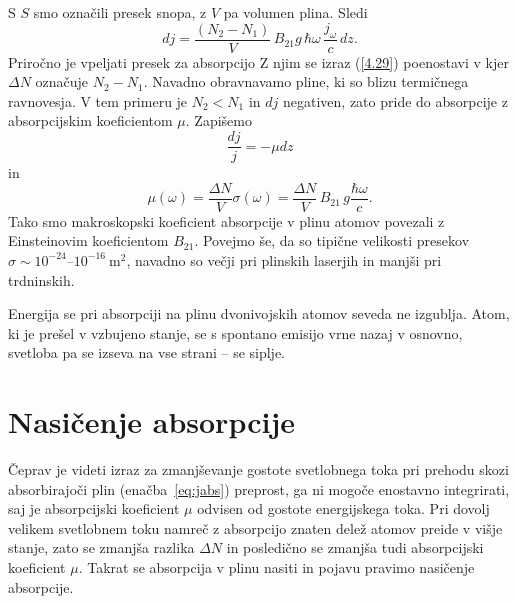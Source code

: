 S $S$ smo označili presek snopa, z $V$ pa volumen plina. Sledi
\begin{equation}
dj=\frac{(N_{2}-N_{1})}{V}\, B_{21}g\, \hbar\omega\,\frac{j_{\omega}}{c}\, dz.
\label{4.29}
\end{equation}
Priročno je vpeljati presek za absorpcijo 
Z njim se izraz (\ref{4.29}) poenostavi v 
kjer $\Delta N$ označuje $N_{2}-N_{1}$.
Navadno obravnavamo pline, ki so blizu termičnega ravnovesja. V tem primeru 
je $N_{2}<N_{1}$ in $dj$ negativen, zato pride do
absorpcije z absorpcijskim koeficientom
$\mu$. Zapišemo 
\begin{equation}
\frac{dj}{j} = -\mu dz
\label{eq:jabs}
\end{equation}
in
\begin{equation}
\mu(\omega)=\frac{\Delta N}{V}\sigma(\omega)=
\frac{\Delta N}{V}\, B_{21}\, g\frac{\hbar\omega}{c}.
\label{eq:muabs1}
\end{equation}
Tako smo makroskopski koeficient absorpcije v plinu atomov povezali
z Einsteinovim koeficientom $B_{21}$. Povejmo še, da so 
tipične velikosti presekov $\sigma \sim 10^{-24}$--$10^{-16}~\si{\metre^2}$,
navadno so večji pri plinskih laserjih in manjši pri trdninskih.

\begin{remark}
Energija se pri absorpciji na plinu dvonivojskih atomov seveda
ne izgublja. Atom, ki je prešel v vzbujeno stanje, se s spontano 
emisijo vrne nazaj v osnovno, svetloba pa se izseva na vse strani -- se siplje. 
\end{remark}

\section{Nasičenje absorpcije}
\label{chap:NasAbs}
Čeprav je videti izraz za zmanjševanje 
gostote svetlobnega toka pri prehodu skozi absorbirajoči plin (enačba~\ref{eq:jabs}) 
preprost, ga ni mogoče enostavno integrirati, saj je absorpcijski koeficient 
$\mu$ odvisen od 
gostote energijskega toka. Pri dovolj velikem svetlobnem toku namreč z 
absorpcijo znaten delež atomov preide v višje stanje, zato se zmanjša razlika $\Delta N$
in posledično se zmanjša tudi absorpcijski koeficient $\mu$. Takrat se absorpcija
v plinu nasiti in pojavu pravimo nasičenje absorpcije.

